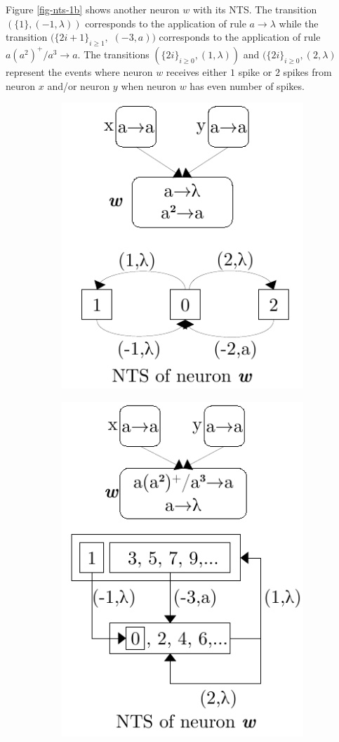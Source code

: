\documentclass[]{elsarticle}
\theoremstyle{definition}
\theoremstyle{definition}
\newcommand{\ra}{\rightarrow}
\begin{document}
Figure \ref{fig-nts-1b} shows another neuron $w$ with its NTS. The transition $(\{1\},
(-1,\lambda))$ corresponds to the application of rule $a\ra\lambda$ while the transition
$(\{2i+1\}_{i\geq 1},$ $(-3,a))$ corresponds to the application of rule $a(a^2)^+/a^3\ra a$. The
transitions $(\{2i\}_{i\geq 0},(1,\lambda))$ and $(\{2i\}_{i\geq 0},(2,\lambda)$ represent the
events where neuron $w$ receives either $1$ spike or $2$ spikes from neuron $x$ and/or neuron $y$ 
when neuron $w$ has even number of spikes.


\begin{figure}[H]
   \centering
   \begin{subfigure}{.49\textwidth}
      \centering
      \includegraphics[scale=0.65]{fig-lts-1a.pdf}
      \caption{}
      \label{fig-nts-1a}
   \end{subfigure}
   \begin{subfigure}{.49\textwidth}
      \centering
      \includegraphics[scale=0.65]{fig-lts-1b.pdf}

\end{subfigure}
\end{figure}
\end{document}
